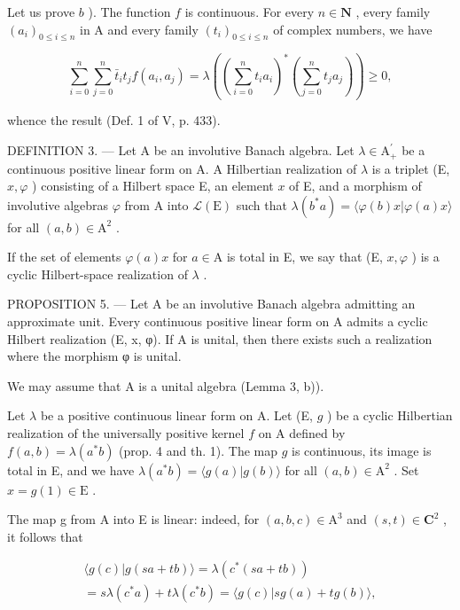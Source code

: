 Let us prove \(b\) ). The function \(f\) is continuous. For every \(n \in \mathbf{N}\) , every family \((a_i)_{0 \leqslant i \leqslant n}\) in A and every family \((t_i)_{0 \leqslant i \leqslant n}\) of complex numbers, we have

\[
\sum_ {i = 0} ^ {n} \sum_ {j = 0} ^ {n} \bar {t} _ {i} t _ {j} f (a _ {i}, a _ {j}) = \lambda \left(\left(\sum_ {i = 0} ^ {n} t _ {i} a _ {i}\right) ^ {*} \left(\sum_ {j = 0} ^ {n} t _ {j} a _ {j}\right)\right) \geqslant 0,
\]

whence the result (Def. 1 of V, p. 433).

DEFINITION 3. — Let A be an involutive Banach algebra. Let \(\lambda \in \mathrm{A}_{+}^{\prime}\) be a continuous positive linear form on A. A Hilbertian realization of \(\lambda\) is a triplet (E, \(x, \varphi\) ) consisting of a Hilbert space E, an element \(x\) of E, and a morphism of involutive algebras \(\varphi\) from A into \(\mathcal{L}(\mathrm{E})\) such that \(\lambda(b^{*}a) = \langle \varphi(b)x | \varphi(a)x \rangle\) for all \((a,b) \in \mathrm{A}^{2}\) .

If the set of elements \(\varphi(a)x\) for \(a\in\mathrm{A}\) is total in E, we say that (E, \(x,\varphi\) ) is a cyclic Hilbert-space realization of \(\lambda\) .

PROPOSITION 5. --- Let A be an involutive Banach algebra admitting an approximate unit. Every continuous positive linear form on A admits a cyclic Hilbert realization (E, x, φ). If A is unital, then there exists such a realization where the morphism φ is unital.

We may assume that A is a unital algebra (Lemma 3, b)).

Let \(\lambda\) be a positive continuous linear form on A. Let (E, \(g\) ) be a cyclic Hilbertian realization of the universally positive kernel \(f\) on A defined by \(f(a,b) = \lambda(a^{*}b)\) (prop. 4 and th. 1). The map \(g\) is continuous, its image is total in E, and we have \(\lambda(a^{*}b) = \langle g(a)|g(b)\rangle\) for all \((a,b) \in \mathrm{A}^2\) . Set \(x = g(1) \in \mathrm{E}\) .

The map g from A into E is linear: indeed, for \((a,b,c)\in\mathrm{A}^{3}\) and \((s,t)\in\mathbf{C}^{2}\) , it follows that

\[
\begin{array}{c} \langle g (c) | g (s a + t b) \rangle = \lambda (c ^ {*} (s a + t b)) \\ = s \lambda (c ^ {*} a) + t \lambda (c ^ {*} b) = \langle g (c) | s g (a) + t g (b) \rangle , \end{array}
\]

